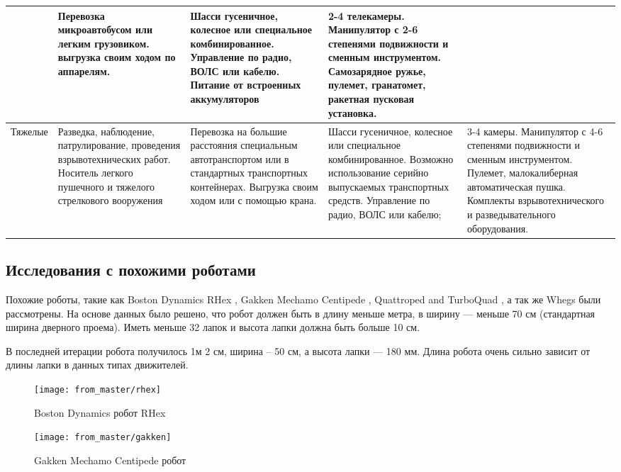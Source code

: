 \begin{small}
\begin{center}
\begin{longtable}[H]{|p{2cm}|p{3cm}|p{3cm}|p{3.2cm}|p{3cm}|}
&
Перевозка микроавтобусом или легким грузовиком. выгрузка своим ходом по аппарелям.
&
Шасси гусеничное, колесное или специальное комбинированное. Управление по радио, ВОЛС или кабелю. Питание от встроенных аккумуляторов 
&
2-4 телекамеры. Манипулятор с 2-6 степенями подвижности и сменным инструментом. Самозарядное ружье, пулемет, гранатомет, ракетная пусковая установка. \\ 
\hline 
\normalsize{Тяжелые}
&
Разведка, наблюдение, патрулирование, проведения взрывотехнических работ. Носитель легкого пушечного и тяжелого стрелкового вооружения
&
Перевозка на большие расстояния специальным автотранспортом или в стандартных транспортных контейнерах. Выгрузка своим ходом или с помощью крана.
&
Шасси гусеничное, колесное или специальное комбинированное. Возможно использование серийно выпускаемых транспортных средств. Управление по радио, ВОЛС или кабелю;  
&
3-4 камеры. Манипулятор с 4-6 степенями подвижности и сменным инструментом. Пулемет, малокалиберная автоматическая пушка. Комплекты взрывотехнического и разведывательного оборудования. \\  
\hline 
\end{longtable}
\end{center}
\end{small}


\subsection{Исследования с похожими роботами}
Похожие роботы, такие как Boston Dynamics RHex \cite{altendorfer2001rhex}, Gakken Mechamo Centipede \cite{miller2008extreme}, Quattroped and TurboQuad \cite{chen2014quattroped,chen2017turboquad}, а так же Whegs \cite{schroer2004comparing} были рассмотрены. На основе данных было решено, что робот должен быть в длину меньше метра, в ширину --- меньше 70 см (стандартная ширина дверного проема). Иметь меньше 32 лапок и высота лапки должна быть больше 10 см.

В последней итерации робота получилось 1м 2 см, ширина -- 50 см, а высота лапки --- 180 мм. Длина робота очень сильно зависит от длины лапки в данных типах движителей.

\begin{figure}[H]
    \centering\texttt{[image: from\_master/rhex]}\\
    \caption{Boston Dynamics робот RHex}
    \label{fig:rhex}
    \end{figure}

    \begin{figure}[H]
        \centering\texttt{[image: from\_master/gakken]}\\
    \caption{Gakken Mechamo Centipede робот}
    \label{fig:gakken}
    \end{figure}

